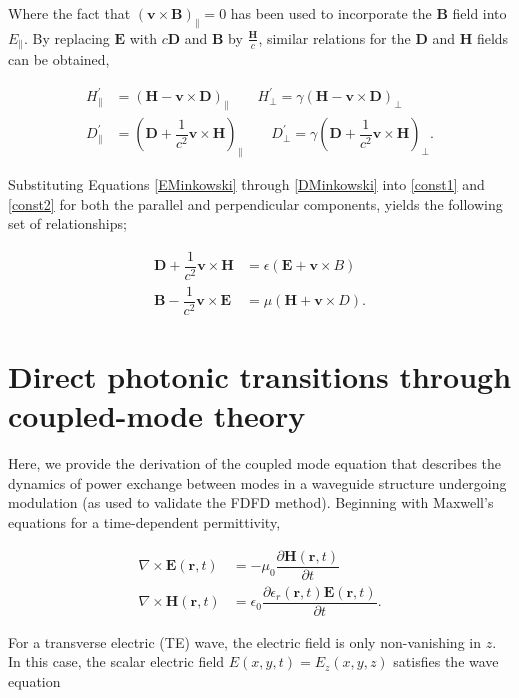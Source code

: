 Where the fact that $(\bm{v} \times \bm{B})_{\parallel} = 0$ has been used to incorporate the $\bm{B}$ field into $E_\parallel$. By replacing $\bm{E} $ with $c\bm{D}$ and $\bm{B}$ by $\frac{\bm{H}}{c}$, similar relations for the $\bm{D}$ and $\bm{H}$ fields can be obtained,

\begin{align}
H^{'}_{\parallel} &= (\bm{H}-\bm{v} \times \bm{D})_\parallel
\qquad H^{'}_{\bot} = \gamma (\bm{H}-\bm{v} \times \bm{D})_\bot \label{HMinkowski}\\
D^{'}_{\parallel} &= (\bm{D}+\dfrac{1}{c^2}\bm{v} \times \bm{H})_\parallel
\qquad D^{'}_{\bot} = \gamma (\bm{D}+\dfrac{1}{c^2}\bm{v} \times \bm{H})_\bot.\label{DMinkowski}
\end{align}

Substituting Equations \ref{EMinkowski} through \ref{DMinkowski} into \ref{const1} and \ref{const2} for both the parallel and perpendicular components, yields the following set of relationships;

\begin{align}
\bm{D} + \dfrac{1}{c^2} \bm{v} \times \bm{H} &= \epsilon (\bm{E} + \bm{v} \times {B}) \\
\bm{B} - \dfrac{1}{c^2} \bm{v} \times \bm{E} &= \mu (\bm{H} + \bm{v} \times {D}).
\label{eqn:minkowski}
\end{align}

\section{Direct photonic transitions through coupled-mode theory}
\label{app:cmt}
Here, we provide the derivation of the coupled mode equation that describes the dynamics of power exchange between modes in a waveguide structure undergoing modulation (as used to validate the FDFD method). Beginning with Maxwell's equations for a time-dependent permittivity,

\begin{align}
\nabla \times \bm{E}(\bm{r},t) &= -\mu_0 \dfrac{\partial \bm{H}(\bm{r},t)}{\partial t} \\
\nabla \times \bm{H}(\bm{r},t) &= \epsilon_0 \dfrac{\partial \epsilon_r(\bm{r},t) \bm{E}(\bm{r},t)}{\partial t}.
\end{align}

For a transverse electric (TE) wave, the electric field is only non-vanishing in $z$. In this case, the scalar electric field $E(x,y,t) = E_z (x,y,z)$ satisfies the wave equation

